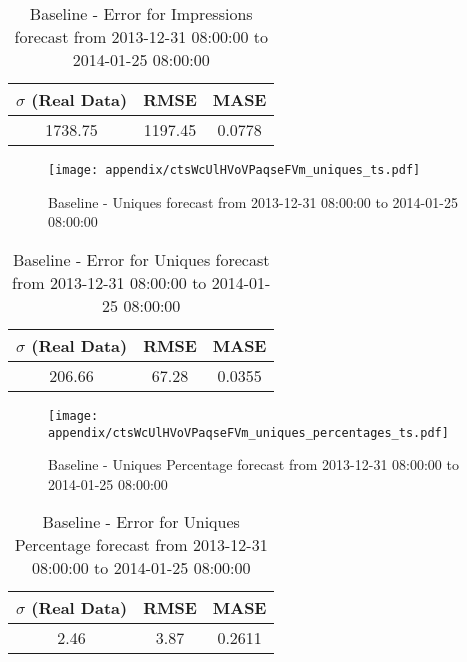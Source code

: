 \begin{table}[H]
\centering
\footnotesize
\begin{tabular}{ccc}
$\sigma$ (Real Data) & RMSE & MASE   \\ \hline
1738.75 & 1197.45 & 0.0778 \\
\end{tabular}

\vspace{0.5cm}

\caption{
Baseline - Error for Impressions forecast from 2013-12-31 08:00:00 to 2014-01-25 08:00:00}
\end{table}

\begin{figure}[H] \begin{center} \leavevmode
\texttt{[image: appendix/ctsWcUlHVoVPaqseFVm\_uniques\_ts.pdf]} \caption{
Baseline - Uniques forecast from 2013-12-31 08:00:00 to 2014-01-25 08:00:00} \label{fig:appendix/ctsWcUlHVoVPaqseFVm_uniques_ts.pdf} \end{center}
\end{figure}

\begin{table}[H]
\centering
\footnotesize
\begin{tabular}{ccc}
$\sigma$ (Real Data) & RMSE & MASE   \\ \hline
206.66 & 67.28 & 0.0355 \\
\end{tabular}

\vspace{0.5cm}

\caption{
Baseline - Error for Uniques forecast from 2013-12-31 08:00:00 to 2014-01-25 08:00:00}
\end{table}

\begin{figure}[H] \begin{center} \leavevmode
\texttt{[image: appendix/ctsWcUlHVoVPaqseFVm\_uniques\_percentages\_ts.pdf]} \caption{
Baseline - Uniques Percentage forecast from 2013-12-31 08:00:00 to 2014-01-25 08:00:00} \label{fig:appendix/ctsWcUlHVoVPaqseFVm_uniques_percentages_ts.pdf} \end{center}
\end{figure}

\begin{table}[H]
\centering
\footnotesize
\begin{tabular}{ccc}
$\sigma$ (Real Data) & RMSE & MASE   \\ \hline
2.46 & 3.87 & 0.2611 \\
\end{tabular}

\vspace{0.5cm}

\caption{
Baseline - Error for Uniques Percentage forecast from 2013-12-31 08:00:00 to 2014-01-25 08:00:00}
\end{table}

